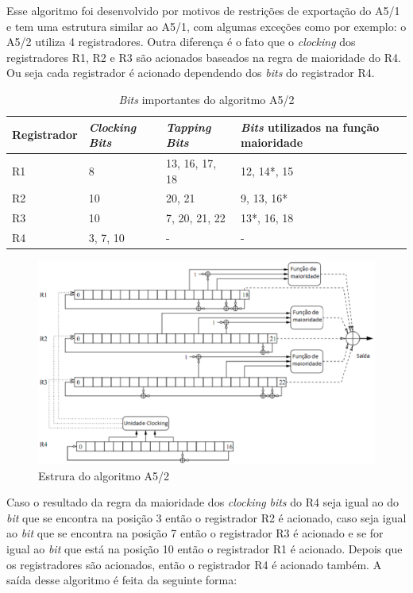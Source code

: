 Esse algoritmo foi desenvolvido por motivos de restrições de exportação do A5/1 e tem uma estrutura similar ao A5/1, com algumas exceções como por exemplo: o A5/2 utiliza 4 registradores. Outra diferença é o fato que o \textit{clocking} dos registradores R1, R2 e R3 são acionados baseados na regra de maioridade do R4. Ou seja cada registrador é acionado dependendo dos \textit{bits} do registrador R4. 

\begin{table}[h]
\centering
	\begin{tabular}{|l|l|l|l|}
		\hline
		Registrador & \textit{Clocking Bits} & \textit{Tapping Bits} & \textit{Bits} utilizados na função maioridade \\ \hline
		R1 & 8 & 13, 16, 17, 18  & 12, 14*\protect\footnotemark , 15\\ \hline
		R2 & 10 & 20, 21 & 9, 13, 16*\\ \hline
		R3 & 10 & 7, 20, 21, 22 & 13*, 16, 18\\ \hline	
		R4 & 3, 7, 10 & - & -\\ \hline
	\end{tabular}
	\caption{\textit{Bits} importantes do algoritmo A5/2}
\end{table}
\begin{figure}[h]
\centering
\includegraphics[keepaspectratio=true,scale=0.5]
    {figuras/a5_2.eps}
    \caption[Estrura do algoritmo A5/2]{Estrura do algoritmo A5/2\protect\footnotemark } 
\end{figure}

Caso o resultado da regra da maioridade dos \textit{clocking} \textit{bits} do R4 seja igual ao do \textit{bit} que se encontra na posição 3 então o registrador R2 é acionado, caso seja igual ao \textit{bit} que se encontra na posição 7 então o registrador R3 é acionado e se for igual ao \textit{bit} que está na posição 10 então o registrador R1 é acionado. Depois que os registradores são acionados, então o registrador R4 é acionado também. A saída desse algoritmo é feita da seguinte forma: 

